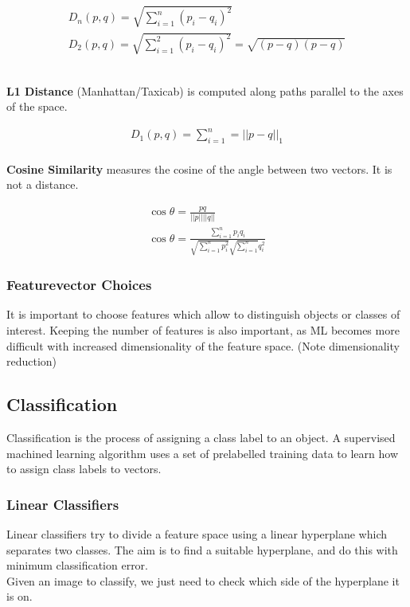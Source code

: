 \begin{align}
    D_{n}(p,q) = \sqrt{\sum_{i=1}^{n}(p_{i}-q_{i})^{2}}\\
    D_{2}(p,q) = \sqrt{\sum_{i=1}^{2}(p_{i}-q_{i})^{2}} = \sqrt{(p-q)(p-q)}
\end{align}

\\
\noindent \textbf{L1 Distance} (Manhattan/Taxicab) is computed along paths parallel to the axes of the space.

\begin{align}
    D_{1}(p,q)=\sum_{i=1}^{n}=||p-q||_{1}
\end{align}
\\

\noindent \textbf{Cosine Similarity} measures the cosine of the angle between two vectors. It is not a distance.

\begin{align}
    \cos{\theta}= \frac{pq}{||p||||q||} \\
    \cos{\theta}= \frac{\sum_{i=1}^{n}p_{i}q_{i}}{\sqrt{\sum_{i=1}^{n}p_{i}^{2}}\sqrt{\sum_{i=1}^{n}}q_{i}^{2}}
\end{align}

\subsubsection{Featurevector Choices}
It is important to choose features which allow to distinguish objects or classes of interest. Keeping the number of features is also important, as ML becomes more difficult with increased dimensionality of the feature space. (Note dimensionality reduction)

\subsection{Classification}
Classification is the process of assigning a class label to an object. A supervised machined learning algorithm uses a set of prelabelled training data to learn how to assign class labels to vectors.

\subsubsection{Linear Classifiers}
Linear classifiers try to divide a feature space using a linear hyperplane which separates two classes. The aim is to find a suitable hyperplane, and do this with minimum classification error.
\\
\noindent Given an image to classify, we just need to check which side of the hyperplane it is on.

